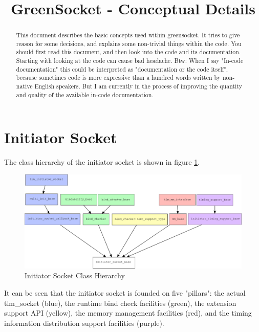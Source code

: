 \documentclass[a4paper,10pt]{article}          %
\title{GreenSocket - Conceptual Details}
\author{\sffamily{Robert G\"unzel (GreenSocs)}}
\date{}
\newcommand{\code}[1]{{\ttfamily#1}}
\begin{document}
\maketitle

\begin{abstract}
This document describes the basic concepts used within greensocket. It tries to give reason for some decisions, and explains some non-trivial things within the code. You should first read this document, and then look into the code and its documentation. Starting with looking at the code can cause bad headache. Btw: When I say "In-code documentation" this could be interpreted as "documentation or the code itself", because sometimes code is more expressive than a hundred words written by non-native English speakers. But I am currently in the process of improving the quantity and quality of the available in-code documentation.
\end{abstract}

\section{Initiator Socket}

The class hierarchy of the initiator socket is shown in figure \ref{fig:isockch}.

\begin{figure}[htbp]
\begin{center}
\includegraphics[scale=0.4]{isockch}
\caption{Initiator Socket Class Hierarchy}
\label{fig:isockch}
\end{center}
\end{figure}

It can be seen that the initiator socket is founded on five "pillars": the actual \code{tlm\_socket} (blue), the runtime bind check facilities (green), the extension support API (yellow), the memory management facilities (red), and the timing information distribution support facilities (purple).
\end{document}
